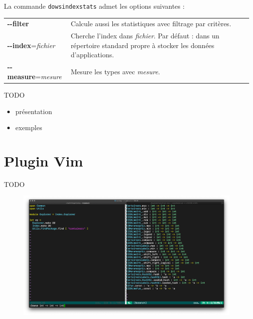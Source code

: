 \documentclass[a4paper]{report}
\theoremstyle{definition}
\newcommand{\dowsindex}{\texttt{dowsindex}\xspace}
\begin{document}
La commande \dowsindex \texttt{stats} admet les options suivantes :

\begin{table}[h]
\begin{tabularx}{\textwidth}{lX}
		\textbf{-{}-filter} &
		Calcule aussi les statistiques avec filtrage par critères.
	\\
		\textbf{-{}-index}=\textit{fichier} &
		Cherche l'index dans \textit{fichier}. Par défaut : dans un répertoire standard propre à stocker les données d'applications.
	\\
		\textbf{-{}-measure}=\textit{mesure} &
		Mesure les types avec \textit{mesure}.
\end{tabularx}
\end{table}

TODO
\begin{itemize}
	\item présentation
	\item exemples
\end{itemize}


\section{Plugin Vim}

TODO

\begin{figure}[h]
	\begin{center}
		\includegraphics[scale=0.15]{images/plugin_vim}
	\end{center}
\end{figure}

\end{document}
